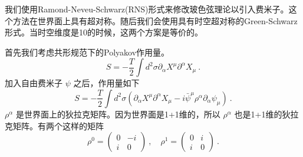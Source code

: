 
我们使用Ramond-Neveu-Schwarz(RNS)形式来修改玻色弦理论以引入费米子。这个方法在世界面上具有超对称。随后我们会使用具有时空超对称的Green-Schwarz形式。当时空维度是10的时候，这两个方案是等价的。

首先我们考虑共形规范下的Polyakov作用量。
\begin{equation}
S = - \frac{T}{2} \int d^2 \sigma \partial_\alpha X^\mu \partial^\alpha X_\mu~.
\end{equation}
加入自由费米子 $\psi$ 之后，作用量如下
\begin{equation}\label{eq_RNS_2}
S = - \frac{T}{2} \int d^2\sigma (\partial_\alpha X^\mu \partial^\alpha X_\mu - i \bar\psi^\mu \rho^\alpha \partial_\alpha \psi_\mu)~.
\end{equation}
$\rho^\alpha$ 是世界面上的狄拉克矩阵。因为世界面是1+1维的，所以 $\rho^\alpha$ 也是1+1维的狄拉克矩阵。有两个这样的矩阵
\begin{equation}
\rho^0 = \begin{pmatrix}
0 & -i \\
i & 0
\end{pmatrix}~, \quad \rho^1 = \begin{pmatrix}
0 & i \\
i & 0
\end{pmatrix}~.
\end{equation}

